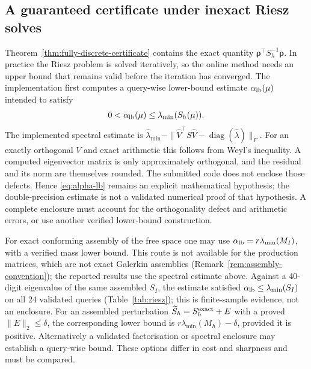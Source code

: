 \documentclass[11pt]{amsart}
\theoremstyle{remark}
\newcommand{\Sh}{S_h}
\newcommand{\rr}{\bm\rho}
\begin{document}
\subsection{A guaranteed certificate under inexact Riesz solves}
\label{ssec:guaranteed}

Theorem~\ref{thm:fully-discrete-certificate} contains the exact quantity
$\rr^\top\Sh^{-1}\rr$.  In practice the Riesz problem is solved iteratively,
so the online method needs an upper bound that remains valid before the
iteration has converged.  The implementation first computes a
query-wise lower-bound estimate $\alpha_{\rm lb}(\mu)$ intended to satisfy
\begin{equation}
  0<\alpha_{\rm lb}(\mu)\le \lambda_{\min}(\Sh(\mu)).
  \label{eq:alpha-lb}
\end{equation}
The implemented spectral estimate is
$\widehat\lambda_{\min}-\|\widehat V^\top S\widehat V-
\operatorname{diag}(\widehat\lambda)\|_F$.
For an exactly orthogonal $V$ and exact arithmetic this follows from Weyl's
inequality. A computed eigenvector matrix is only approximately orthogonal,
and the residual and its norm are themselves rounded. The submitted code
does not enclose those defects. Hence \eqref{eq:alpha-lb} remains an
explicit mathematical hypothesis; the double-precision estimate is not a
validated numerical proof of that hypothesis. A complete enclosure must
account for the orthogonality defect and arithmetic errors, or use another
verified lower-bound construction.

For exact conforming assembly of the free space one may use
$\alpha_{\rm lb}=r\lambda_{\min}(M_I)$, with a verified mass lower bound.
This route is not available for the production matrices, which are not
exact Galerkin assemblies (Remark~\ref{rem:assembly-convention}); the
reported results use the spectral estimate above. Against a 40-digit
eigenvalue of the same assembled $S_I$, the estimate satisfied
$\alpha_{\rm lb}\le\lambda_{\min}(S_I)$ on all 24 validated queries
(Table~\ref{tab:riesz}); this is finite-sample evidence, not an enclosure.
For an assembled perturbation $\widetilde S_h=S_h^{\rm exact}+E$ with a
proved $\|E\|_2\le\delta$, the corresponding lower bound is
$r\lambda_{\min}(M_h)-\delta$, provided it is positive. Alternatively a
validated factorisation or spectral enclosure may establish a query-wise
bound. These options differ in cost and sharpness and must be compared.
\end{document}

